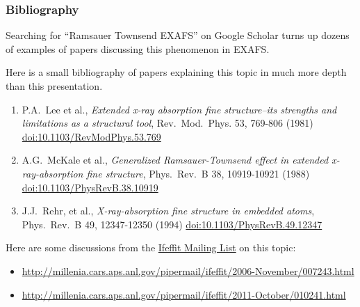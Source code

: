 \documentclass[10pt, xcolor=x11names, compress]{beamer}
\begin{document}
\begin{frame}
  \frametitle{Bibliography}
  \small%
  Searching for ``Ramsauer Townsend EXAFS'' on Google Scholar turns up
  dozens of examples of papers discussing this phenomenon in EXAFS.

  \medskip

  Here is a small bibliography of papers explaining this topic in much
  more depth than this presentation.
  
  \begin{enumerate}
  \item P.A.\ Lee et al.,
    \textit{Extended x-ray absorption fine structure--its strengths and limitations as a structural tool},
    Rev.\ Mod.\ Phys. 53, 769-806 (1981)
    \href{http://dx.doi.org/10.1103/RevModPhys.53.769}
    {\color{Blue2}doi:10.1103/RevModPhys.53.769}
  \item A.G.\ McKale et al., \textit{Generalized Ramsauer-Townsend
      effect in extended x-ray-absorption fine structure}, Phys.\ Rev.\ B
    38, 10919-10921 (1988)
    \href{http://dx.doi.org/10.1103/PhysRevB.38.10919}
    {\color{Blue2}doi:10.1103/PhysRevB.38.10919}
  \item J.J.\ Rehr, et al., \textit{X-ray-absorption fine structure in
      embedded atoms}, Phys.\ Rev.\ B 49, 12347-12350 (1994)
    \href{http://dx.doi.org/10.1103/PhysRevB.49.12347}
    {\color{Blue2}doi:10.1103/PhysRevB.49.12347}
  \end{enumerate}

  Here are some discussions from the
  \href{http://millenia.cars.aps.anl.gov/mailman/listinfo/ifeffit}
  {\color{Blue2}Ifeffit Mailing List} on this topic:
  \begin{itemize}
  \item \scriptsize
    \href{http://millenia.cars.aps.anl.gov/pipermail/ifeffit/2006-November/007243.html}
    {\color{Blue2}http://millenia.cars.aps.anl.gov/pipermail/ifeffit/2006-November/007243.html}
  \item \scriptsize
    \href{http://millenia.cars.aps.anl.gov/pipermail/ifeffit/2011-October/010241.html}
    {\color{Blue2}http://millenia.cars.aps.anl.gov/pipermail/ifeffit/2011-October/010241.html}
  \end{itemize}
\end{frame}
\end{document}
